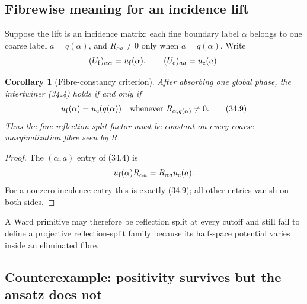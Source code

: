 \documentclass[11pt]{article}
\newtheorem{corollary}[theorem]{Corollary}
\theoremstyle{remark}
\begin{document}
\subsection{Fibrewise meaning for an incidence lift}

Suppose the lift is an incidence matrix: each fine boundary label
\(\alpha\) belongs to one coarse label \(a=q(\alpha)\), and
\(R_{\alpha a}\ne0\) only when \(a=q(\alpha)\).  Write
\[
 (U_{\rm f})_{\alpha\alpha}=u_{\rm f}(\alpha),
 \qquad
 (U_{\rm c})_{aa}=u_{\rm c}(a).
\]

\begin{corollary}[Fibre-constancy criterion]
\label{cor:v12v34-fibre-constant}
After absorbing one global phase, the intertwiner (34.4) holds if
and only if
\begin{equation}
 u_{\rm f}(\alpha)=u_{\rm c}(q(\alpha))
 \quad\text{whenever }R_{\alpha,q(\alpha)}\ne0.   \tag{34.9}
\end{equation}
Thus the fine reflection-split factor must be constant on every
coarse marginalization fibre seen by \(R\).
\end{corollary}

\begin{proof}
The \((\alpha,a)\) entry of (34.4) is
\[
 u_{\rm f}(\alpha)R_{\alpha a}
 =
 R_{\alpha a}u_{\rm c}(a).
\]
For a nonzero incidence entry this is exactly (34.9); all other
entries vanish on both sides.
\end{proof}

A Ward primitive may therefore be reflection split at every cutoff
and still fail to define a projective reflection-split family because
its half-space potential varies inside an eliminated fibre.

\subsection{Counterexample: positivity survives but the ansatz does
not}
\end{document}
